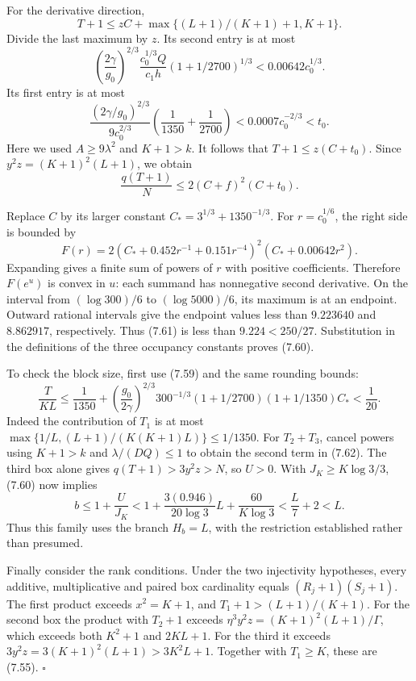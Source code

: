 \documentclass[
  11pt,
  a4paper,
]{article}
\begin{document}
For the derivative direction, \[
T+1\le zC+\max\{(L+1)/(K+1)+1,K+1\}.
\] Divide the last maximum by \(z\). Its second entry is at most \[
\left(\frac{2\gamma}{g_0}\right)^{2/3}
\frac{c_0^{1/3}Q}{c_1h}(1+1/2700)^{1/3}
<0.00642c_0^{1/3}.
\] Its first entry is at most \[
\frac{(2\gamma/g_0)^{2/3}}{9c_0^{2/3}}
\left(\frac1{1350}+\frac1{2700}\right)
<0.0007c_0^{-2/3}<t_0.
\] Here we used \(A\ge9\lambda^2\) and \(K+1>k\). It follows that
\(T+1\le z(C+t_0)\). Since \(y^2z=(K+1)^2(L+1)\), we obtain \[
\frac{q(T+1)}N\le2(C+f)^2(C+t_0). \tag{7.61}
\]

Replace \(C\) by its larger constant \(C_*=3^{1/3}+1350^{-1/3}\). For
\(r=c_0^{1/6}\), the right side is bounded by \[
F(r)=2(C_*+0.452r^{-1}+0.151r^{-4})^2
       (C_*+0.00642r^2).
\] Expanding gives a finite sum of powers of \(r\) with positive
coefficients. Therefore \(F(e^u)\) is convex in \(u\): each summand has
nonnegative second derivative. On the interval from \((\log300)/6\) to
\((\log5000)/6\), its maximum is at an endpoint. Outward rational
intervals give the endpoint values less than \(9.223640\) and
\(8.862917\), respectively. Thus (7.61) is less than \(9.224<250/27\).
Substitution in the definitions of the three occupancy constants proves
(7.60).

To check the block size, first use (7.59) and the same rounding bounds:
\[
\frac{T}{KL}\le\frac1{1350}
+\left(\frac{g_0}{2\gamma}\right)^{2/3}300^{-1/3}
 (1+1/2700)(1+1/1350)C_*<\frac1{20}.
\tag{7.62}
\] Indeed the contribution of \(T_1\) is at most
\(\max\{1/L,(L+1)/(K(K+1)L)\}\le1/1350\). For \(T_2+T_3\), cancel powers
using \(K+1>k\) and \(\lambda/(DQ)\le1\) to obtain the second term in
(7.62). The third box alone gives \(q(T+1)>3y^2z>N\), so \(U>0\). With
\(J_K\ge K\log3/3\), (7.60) now implies \[
b\le1+\frac U{J_K}
<1+\frac{3(0.946)}{20\log3}L+\frac{60}{K\log3}
<\frac L7+2<L.
\] Thus this family uses the branch \(H_b=L\), with the restriction
established rather than presumed.

Finally consider the rank conditions. Under the two injectivity
hypotheses, every additive, multiplicative and paired box cardinality
equals \((R_j+1)(S_j+1)\). The first product exceeds \(x^2=K+1\), and
\(T_1+1>(L+1)/(K+1)\). For the second box the product with \(T_2+1\)
exceeds \(\eta^3y^2z=(K+1)^2(L+1)/\Gamma\), which exceeds both \(K^2+1\)
and \(2KL+1\). For the third it exceeds \(3y^2z=3(K+1)^2(L+1)>3K^2L+1\).
Together with \(T_1\ge K\), these are (7.55). \(\square\)
\end{document}
